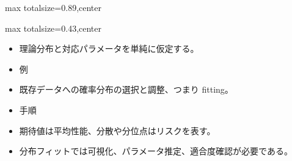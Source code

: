 \begin{minipage}[t]{0.58\textwidth}
\begin{adjustbox}{max totalsize={\textwidth}{0.89\textheight},center}
\begin{minipage}{\textwidth}
\end{minipage}
\end{adjustbox}
\end{minipage}


\clearpage
{}
\begin{minipage}[t]{0.405\textwidth}
\begin{adjustbox}{max totalsize={\textwidth}{0.43\textheight},center}
\begin{minipage}{\textwidth}\scriptsize
{}\begin{itemize}
\item 理論分布と対応パラメータを単純に仮定する。
\item 例
\item 既存データへの確率分布の選択と調整、つまり fitting。
\item 手順
\end{itemize}\begin{itemize}
\item 期待値は平均性能、分散や分位点はリスクを表す。
\item 分布フィットでは可視化、パラメータ推定、適合度確認が必要である。
\end{itemize}
\end{minipage}
\end{adjustbox}
\end{minipage}\hfill
